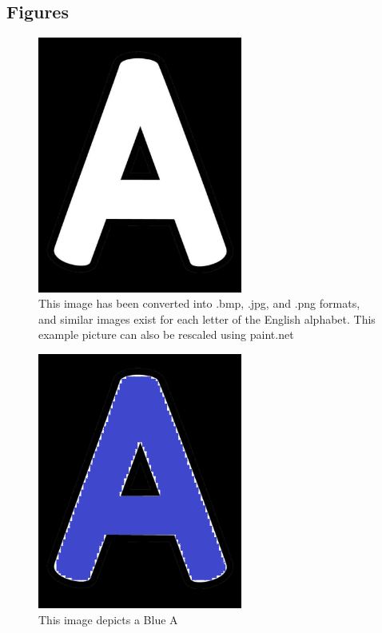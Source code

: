 \documentclass[12pt, titlepage]{article}
\begin{document}
\subsection{Figures}

\begin{figure}[h!]
  \begin{center}
   \includegraphics[width=0.6\textwidth]{A}
  \caption{This image has been converted into .bmp, .jpg, and .png formats,
  and similar images exist for each letter of the English alphabet. This example picture can also be rescaled using paint.net}
  \label{Fig_A} 
  \end{center}
  \end{figure}

\begin{figure}[h!]
  \begin{center}
    \includegraphics[width=0.6\textwidth]{BlueA}
  \caption{This image depicts a Blue A}
  \label{Fig_blueA} 
  \end{center}
  \end{figure}
\end{document}
